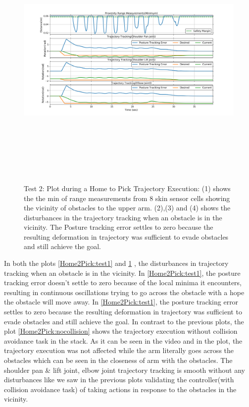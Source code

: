 \begin{figure}[H]
\centering
\includegraphics[width=18cm,height=13cm,center]{chapters/doa/images/delft/test_home2pick/plot_1.png}
\caption{Test 2: Plot during a Home to Pick Trajectory Execution: (1) shows the the min of range measurements from 8 skin sensor cells showing the vicinity of obstacles to the upper arm. (2),(3) and (4) shows the disturbances in the trajectory tracking when an obstacle is in the vicinity. The Posture tracking error settles to zero because the resulting deformation in trajectory was sufficient to evade obstacles and still achieve the goal.}
\label{Home2Pick:test2}
\end{figure}

In both the plots \ref{Home2Pick:test1} and \ref{Home2Pick:test2} , the disturbances in trajectory tracking when an obstacle is in the vicinity. In \ref{Home2Pick:test1}, the posture tracking error doesn’t settle to zero because of the local minima it encounters, resulting in continuous oscillations trying to go across the obstacle with a hope the obstacle will move away. In \ref{Home2Pick:test1}, the posture tracking error settles to zero because the resulting deformation in trajectory was sufficient to evade obstacles and still achieve the goal. In contrast to the previous plots, the plot \ref{Home2Pick:nocollision} shows the trajectory execution without collision avoidance task in the stack. As it can be seen in the video and in the plot, the trajectory execution was not affected while the arm literally goes across the obstacles which can be seen in the closeness of arm with the obstacles. The shoulder pan \& lift joint, elbow joint trajectory tracking is smooth without any disturbances like we saw in the previous plots validating the controller(with collision avoidance task) of taking actions in response to the obstacles in the vicinity.

